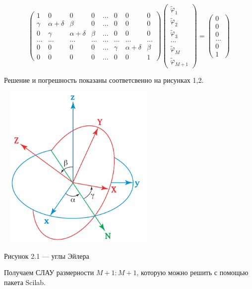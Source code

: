 \documentclass[14pt]{extreport}
\begin{document}
\begin{equation}
 \begin{pmatrix} 1 & 0 & 0 & 0 & ... & 0 & 0 & 0 \\
\gamma & \alpha+\delta & \beta & 0 & ... & 0 & 0 & 0\\
0 & \gamma & \alpha+\delta & \beta & ... & 0 & 0 & 0\\
... & ... & ... & ... & ... & ... & ... & ... \\
0 & 0 & 0 & 0 & ... & \gamma & \alpha+\delta & \beta \\
0 & 0 & 0 & 0 & ... & 0 & 0 & 1
\end{pmatrix}\begin{pmatrix}\widetilde{\varphi}_1\\ \widetilde{\varphi}_2\\ \widetilde{\varphi}_3\\ ... \\ \widetilde{\varphi}_M \\ \widetilde{\varphi}_{M+1}\end{pmatrix}=\begin{pmatrix} 0\\0\\0\\...\\0\\1\end{pmatrix}
\end{equation}

Решение и погрешность показаны соответсвенно на рисунках 1,2.

\begin{center}
 \includegraphics[width=8cm, height=8cm]{1.png}
 
 Рисунок 2.1 --- углы Эйлера
\end{center}

Получаем СЛАУ размерности $M+1:M+1$, которую можно решить с помощью пакета Scilab. 
\end{document}
